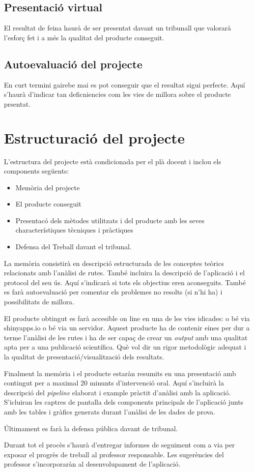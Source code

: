\documentclass[]{article}
\begin{document}
\subsection{Presentació virtual}
El resultat de feina haurà de ser presentat davant un tribunall que valorarà l'esforç fet i a més la qualitat del producte conseguit.

\subsection{Autoevaluació del projecte}
En curt termini gairebe mai es pot conseguir que el resultat sigui perfecte. Aquí s'haurà d'indicar tan deficniencies com les vies de millora sobre el producte prsentat.

\section{Estructuració del projecte}

L'estructura del projecte està condicionada per el plà docent i inclou els components següents:

\begin{itemize}
\item Memòria del projecte
\item El producte conseguit
\item Presentacó dels mètodes utilitzats i del producte amb les seves characterístiques tècniques i pràctiques
\item Defensa del Treball davant el tribunal.
\end{itemize}

La memòria consistirà en descripció estructurada de les conceptes teòrics relacionats amb l'anàlisi de rutes. També incluira la descripció de l'aplicació i el protocol del seu ús. Aquí s'indicarà si tots els objectius eren aconseguits. També es farà autoevaluació per comentar els problemes no resolts (si n'hi ha) i possibilitats de millora. 

El producte obtingut es farà accesible on line en una de les vies idicades: o bé via shinyapps.io o bé via un servidor. Aquest producte ha de contenir eines per dur a terme l'anàlisi de les rutes i ha de ser capaç de crear un \textit{output} amb una qualitat apta per a una publicació scientífica. Què vol dir un rigor metodològic adequat i la qualitat de presentació/visualització dels resultats.

Finalment la memòria i el producte estaràn resumits en una presentació amb contingut per a  maximal 20 minunts d'intervenció oral. Aquí s'incluirà la descripció del \textit{pipeline} elaborat i  example pràctit d'anàlisi amb la aplicació. S'icluiran les captres de pantalla dels components principals de l'aplicació junts amb les tables i gràfics generats durant l'anàlisi de les dades de prova. 

Últimament es farà la defensa pública davant de tribunal.

Durant tot el procès s'haurà d'entregar informes de seguiment com a via per exposar el progrès de treball al professor responsable. Les sugerències del professor s'incorporaràn al  desenvolupament de l'aplicació.



\end{document}
